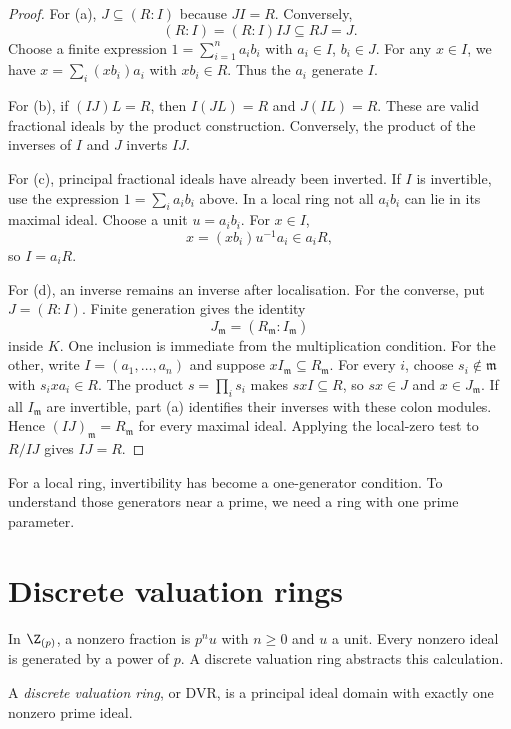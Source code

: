 \begin{proof}
For (a), $J\subseteq(R:I)$ because $JI=R$. Conversely,
\[
 (R:I)=(R:I)IJ\subseteq RJ=J.
\]
Choose a finite expression $1=\sum_{i=1}^na_ib_i$ with $a_i\in I$, $b_i\in J$. For any $x\in I$, we have $x=\sum_i(xb_i)a_i$ with $xb_i\in R$. Thus the $a_i$ generate $I$.

For (b), if $(IJ)L=R$, then $I(JL)=R$ and $J(IL)=R$. These are valid fractional ideals by the product construction. Conversely, the product of the inverses of $I$ and $J$ inverts $IJ$.

For (c), principal fractional ideals have already been inverted. If $I$ is invertible, use the expression $1=\sum_i a_ib_i$ above. In a local ring not all $a_ib_i$ can lie in its maximal ideal. Choose a unit $u=a_ib_i$. For $x\in I$,
\[
 x=(xb_i)u^{-1}a_i\in a_iR,
\]
so $I=a_iR$.

For (d), an inverse remains an inverse after localisation. For the converse, put $J=(R:I)$. Finite generation gives the identity
\[
 J_{\mathfrak m}=(R_{\mathfrak m}:I_{\mathfrak m})
\]
inside $K$. One inclusion is immediate from the multiplication condition. For the other, write $I=(a_1,\ldots,a_n)$ and suppose $xI_{\mathfrak m}\subseteq R_{\mathfrak m}$. For every $i$, choose $s_i\notin\mathfrak m$ with $s_i xa_i\in R$. The product $s=\prod_i s_i$ makes $sxI\subseteq R$, so $sx\in J$ and $x\in J_{\mathfrak m}$. If all $I_{\mathfrak m}$ are invertible, part (a) identifies their inverses with these colon modules. Hence $(IJ)_{\mathfrak m}=R_{\mathfrak m}$ for every maximal ideal. Applying the local-zero test to $R/IJ$ gives $IJ=R$.
\end{proof}

For a local ring, invertibility has become a one-generator condition. To understand those generators near a prime, we need a ring with one prime parameter.

\section{Discrete valuation rings}

In $\Z_{(p)}$, a nonzero fraction is $p^nu$ with $n\ge0$ and $u$ a unit. Every nonzero ideal is generated by a power of $p$. A discrete valuation ring abstracts this calculation.

\begin{definition}\label{def:dvr}
A \emph{discrete valuation ring}, or DVR, is a principal ideal domain with exactly one nonzero prime ideal.
\end{definition}

